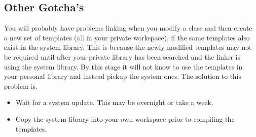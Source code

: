\subsection{Other Gotcha's}
You will probably have problems linking when you modify a class and then
create a new set of templates (all in your private workspace), if the same
templates also exist in the system library. This is because the newly
modified templates may not be required until after your private library has
been searched and the linker is using the system library. By this stage it
will not know to use the templates in your personal library and instead
pickup the system ones. The solution to this problem is.
\begin{itemize}
\item Wait for a system update. This may be overnight or take a week.
\item Copy the system library into your own workspace prior to compiling the
  templates. 
\end{itemize}
